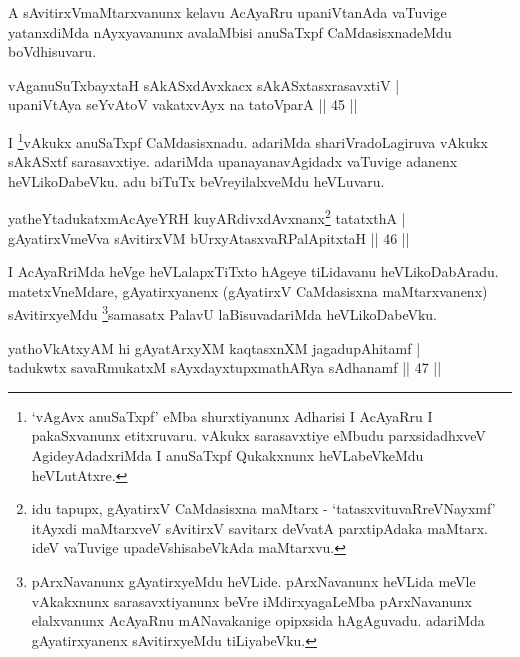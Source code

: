 \begin{artha} 
A sAvitirxVmaMtarxvanunx kelavu AcAyaRru upaniVtanAda vaTuvige 
yatanxdiMda nAyxyavanunx avalaMbisi anuSaTxpf CaMdasisxnadeMdu 
boVdhisuvaru.
\end{artha}


\begin{shl}
vAganuSuTxbayxtaH sAkASxdAvxkacx sAkASxtasxrasavxtiV | \\
upaniVtAya seYvAtoV vakatxvAyx na tatoV\s parA \hfill ||  45 || 
\end{shl}

\begin{artha} 
I \footnote{`vAgAvx anuSaTxpf' eMba shurxtiyanunx Adharisi I 
AcAyaRru I pakaSxvanunx etitxruvaru. vAkukx sarasavxtiye eMbudu 
parxsidadhxveV AgideyAdadxriMda I anuSaTxpf Qukakxnunx heVLabeVkeMdu 
heVLutAtxre.}vAkukx anuSaTxpf CaMdasisxnadu. adariMda 
shariVradoLagiruva vAkukx sAkASxtf sarasavxtiye. adariMda 
upanayanavAgidadx vaTuvige adanenx heVLikoDabeVku. adu biTuTx 
beVreyilalxveMdu heVLuvaru.
\end{artha}


\begin{shl}
yatheYtadukatxmAcAyeYRH kuyARdivxdAvxnanx\footnote{idu tapupx, gAyatirxV CaMdasisxna maMtarx - `tatasxvituvaRreVNayxmf' itAyxdi maMtarxveV sAvitirxV savitarx deVvatA parxtipAdaka maMtarx. ideV vaTuvige upadeVshisabeVkAda maMtarxvu.} tatatxthA | \\
gAyatirxVmeVva sAvitirxVM bUrxyAtasxvaRPalApitxtaH \hfill ||  46 || 
\end{shl}

\begin{artha} 
I AcAyaRriMda heVge heVLalapxTiTxto hAgeye tiLidavanu heVLikoDabAradu. 
matetxVneMdare, gAyatirxyanenx (gAyatirxV CaMdasisxna maMtarxvanenx) 
sAvitirxyeMdu \footnote{pArxNavanunx gAyatirxyeMdu heVLide. 
pArxNavanunx heVLida meVle vAkakxnunx sarasavxtiyanunx beVre 
iMdirxyagaLeMba pArxNavanunx elalxvanunx AcAyaRnu mANavakanige 
opipxsida hAgAguvadu. adariMda gAyatirxyanenx sAvitirxyeMdu 
tiLiyabeVku.}samasatx PalavU laBisuvadariMda 
heVLikoDabeVku.
\end{artha}


\begin{shl}
yathoVkAtxyAM hi gAyatArxyXM kaqtasxnXM jagadupAhitamf | \\
tadukwtx savaRmukatxM sAyxdayxtupxmathARya sAdhanamf \hfill ||  47 || 
\end{shl}

